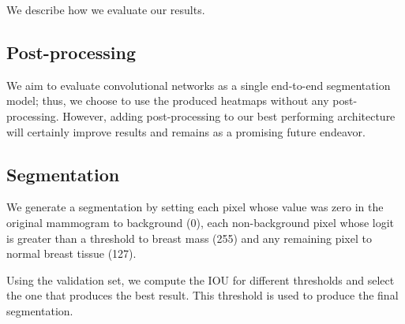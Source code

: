 We describe how we evaluate our results.

\subsection{Post-processing}
We aim to evaluate convolutional networks as a single end-to-end segmentation model;
thus, we choose to use the produced heatmaps without any post-processing. However, adding post-processing to our best performing architecture will certainly improve results and remains as a promising future endeavor.%


\subsection{Segmentation}
We generate a segmentation by setting each pixel whose value was zero in the original mammogram to background (0), each non-background pixel whose logit is greater than a threshold to breast mass (255) and any remaining pixel to normal breast tissue (127).

Using the validation set, we compute the IOU for different thresholds and select the one that produces the best result. This threshold is used to produce the final segmentation.


